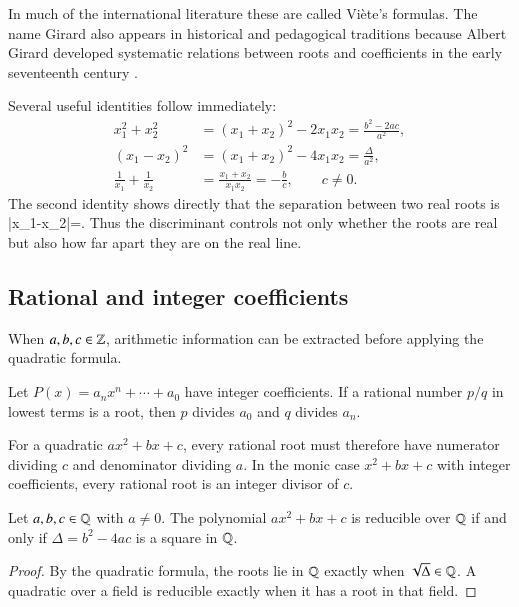 In much of the international literature these are called Vi\`ete's formulas. The name Girard also appears in historical and pedagogical traditions because Albert Girard developed systematic relations between roots and coefficients in the early seventeenth century \cite{katz2009,boyer2011}.

Several useful identities follow immediately:
\bse
\begin{align}
x_1^2+x_2^2
&=(x_1+x_2)^2-2x_1x_2
=\frac{b^2-2ac}{a^2},\\
(x_1-x_2)^2
&=(x_1+x_2)^2-4x_1x_2
=\frac{\Delta}{a^2},\\
\frac{1}{x_1}+\frac{1}{x_2}
&=\frac{x_1+x_2}{x_1x_2}
=-\frac{b}{c},\qquad c\neq0.
\end{align}
\ese
The second identity shows directly that the separation between two real roots is
\be
|x_1-x_2|=.
\ee
Thus the discriminant controls not only whether the roots are real but also how far apart they are on the real line.

\subsection{Rational and integer coefficients}

When $a,b,c\in\mathbb{Z}$, arithmetic information can be extracted before applying the quadratic formula.

\begin{theorem}
Let $P(x)=a_nx^n+\cdots+a_0$ have integer coefficients. If a rational number $p/q$ in lowest terms is a root, then $p$ divides $a_0$ and $q$ divides $a_n$.
\end{theorem}

For a quadratic $ax^2+bx+c$, every rational root must therefore have numerator dividing $c$ and denominator dividing $a$. In the monic case $x^2+bx+c$ with integer coefficients, every rational root is an integer divisor of $c$.

\begin{proposition}
Let $a,b,c\in\mathbb{Q}$ with $a\neq0$. The polynomial $ax^2+bx+c$ is reducible over $\mathbb{Q}$ if and only if $\Delta=b^2-4ac$ is a square in $\mathbb{Q}$.
\end{proposition}

\begin{proof}
By the quadratic formula, the roots lie in $\mathbb{Q}$ exactly when $\sqrt{\Delta}\in\mathbb{Q}$. A quadratic over a field is reducible exactly when it has a root in that field.
\end{proof}

